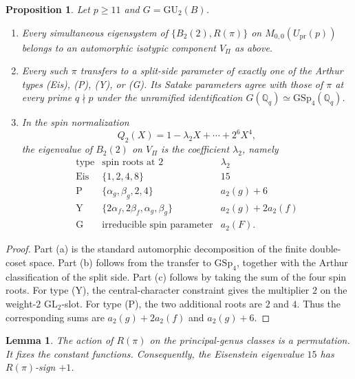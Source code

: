 \documentclass[11pt]{amsart}
\theoremstyle{plain}
\newtheorem{proposition}[theorem]{Proposition}
\newtheorem{lemma}[theorem]{Lemma}
\theoremstyle{definition}
\newcommand{\Q}{\mathbb{Q}}
\newcommand{\GU}{\mathrm{GU}}
\newcommand{\GSp}{\mathrm{GSp}}
\newcommand{\Upr}{U_{\mathrm{pr}}}
\providecommand{\Upr}{U_{\mathrm{pr}}}
\begin{document}
	\begin{proposition}	\label{prop:arthur}
		Let $p\ge11$ and $G=\GU_2(B)$.
		\begin{enumerate}[label=\textup{(\alph*)},leftmargin=2.3em]
			\item Every simultaneous eigensystem of $\{B_2(2),R(\pi)\}$ on
			$M_{0,0}(\Upr(p))$ belongs to an automorphic isotypic component $V_\Pi$
			as above.
			\item Every such $\pi$ transfers to a split-side parameter of exactly one
			of the Arthur types \textup{(Eis)}, \textup{(P)}, \textup{(Y)}, or
			\textup{(G)}. Its Satake parameters agree with those of $\pi$ at every
			prime $q\nmid p$ under the unramified identification
			$G(\Q_q)\simeq\GSp_4(\Q_q)$.
			\item In the spin normalization
			\[
			Q_2(X)=1-\lambda_2X+\cdots+2^6X^4,
			\]
			the eigenvalue of $B_2(2)$ on $V_\Pi$ is the coefficient $\lambda_2$,
			namely
			\[
			\begin{array}{c|c|c}
				\text{type} & \text{spin roots at }2 & \lambda_2\\
				\hline
				\mathrm{Eis} & \{1,2,4,8\} & 15\\
				\mathrm{P} & \{\alpha_g,\beta_g,2,4\} & a_2(g)+6\\
				\mathrm{Y} & \{2\alpha_f,2\beta_f,\alpha_g,\beta_g\}
				& a_2(g)+2a_2(f)\\
				\mathrm{G} & \text{irreducible spin parameter} & a_2(F).
			\end{array}
			\]
		\end{enumerate}
	\end{proposition}
	
	\begin{proof}
		Part \textup{(a)} is the standard automorphic decomposition of the
		finite double-coset space. Part \textup{(b)} follows from the transfer to
		$\GSp_4$, together with the Arthur classification of the split side.
		Part \textup{(c)} follows by taking the sum of the four spin roots. For
		type \textup{(Y)}, the central-character constraint gives the multiplier
		$2$ on the weight-$2$ $\mathrm{GL}_2$-slot. For type \textup{(P)}, the two
		additional roots are $2$ and $4$. Thus the corresponding sums are
		$a_2(g)+2a_2(f)$ and $a_2(g)+6$.
	\end{proof}
	
	\begin{lemma}
		\label{lem:eis}
		The action of $R(\pi)$ on the principal-genus classes is a permutation.
		It fixes the constant functions. Consequently, the Eisenstein eigenvalue
		$15$ has $R(\pi)$-sign $+1$.
	\end{lemma}
	
\end{document}
